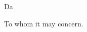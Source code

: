 \documentclass[fontsize=12pt, paper=a4]{scrlttr2}
\begin{document}
\begin{letter}{Da}

\opening{To whom it may concern.}




\closing{} %

\end{letter}
\end{document}

